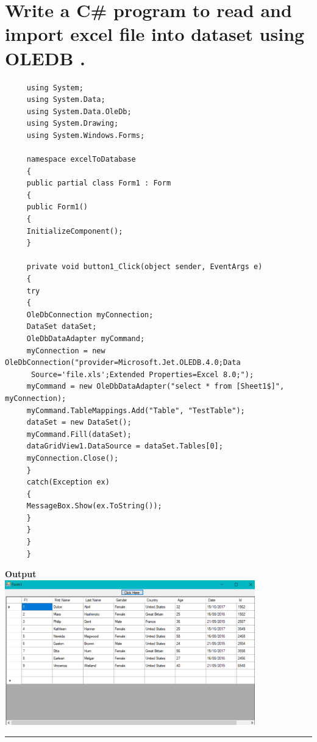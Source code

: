 \documentclass[11pt,dvipsnames,cmyk]{article}
\begin{document}
	 \section*{Write a C\# program to read and import excel file into dataset using OLEDB .}
	 \begin{verbatim}
	 using System;
	 using System.Data;
	 using System.Data.OleDb;
	 using System.Drawing;
	 using System.Windows.Forms;
	 
	 namespace excelToDatabase
	 {
	 public partial class Form1 : Form
	 {
	 public Form1()
	 {
	 InitializeComponent();
	 }
	 
	 private void button1_Click(object sender, EventArgs e)
	 {
	 try
	 {
	 OleDbConnection myConnection;
	 DataSet dataSet;
	 OleDbDataAdapter myCommand;
	 myConnection = new OleDbConnection("provider=Microsoft.Jet.OLEDB.4.0;Data
	  Source='file.xls';Extended Properties=Excel 8.0;");
	 myCommand = new OleDbDataAdapter("select * from [Sheet1$]", myConnection);
	 myCommand.TableMappings.Add("Table", "TestTable");
	 dataSet = new DataSet();
	 myCommand.Fill(dataSet);
	 dataGridView1.DataSource = dataSet.Tables[0];
	 myConnection.Close();
	 }
	 catch(Exception ex)
	 {
	 MessageBox.Show(ex.ToString());
	 }
	 }
	 }
	 }
	 \end{verbatim}
	 \begin{center}
	 	\textbf{Output}\\
	 	\hfill\break\includegraphics[width=4.27in]{7.png}
	 \end{center}
	 \rule{6.27in}{1.2pt}
	 
\end{document}
